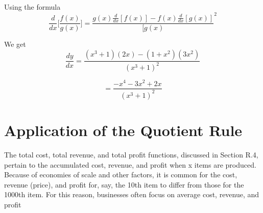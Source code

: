 \documentclass{report}
\begin{document}
\bigbreak \noindent \bigbreak \noindent
Using the formula
$$ \frac{d}{dx}\bigg[ \frac{f(x)}{g(x)}\bigg] = \frac{g(x) \frac{d}{dx}[f(x)] - f(x) \frac{d}{dx}[g(x)]}{[g(x)}^2$$

\bigbreak \noindent \bigbreak \noindent
We get
$$ \dfrac{dy}{dx} = \dfrac{\left(x^3+1\right)\left(2x\right) - \left(1+x^2\right)\left(3x^2\right)}{\left(x^3 + 1\right)^2}$$ 
\vspace{1mm}

  $$= \dfrac{-x^4 - 3x^2 + 2x}{\left(x^3 + 1\right)^2}$$
  \bigbreak \noindent \bigbreak \noindent
  \section*{Application of the Quotient Rule}  
  The total cost, total revenue, and total profit functions, discussed in Section R.4, pertain to the accumulated cost, revenue, and profit when x items are produced. Because of economies of scale and other factors, it is common for the cost, revenue (price), and profit for, say, the 10th item to differ from those for the 1000th item. For this reason, businesses often focus on average cost, revenue, and profit
  \bigbreak \noindent \bigbreak \noindent
  \bigbreak \bigbreak
  \pagebreak
\end{document}
